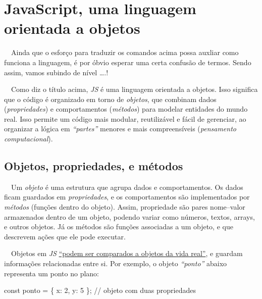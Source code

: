 \documentclass[
  portuguese,
  letterpaper,
  DIV=11,
  numbers=noendperiod]{scrreprt}
\newenvironment{Shaded}{\begin{snugshade}}{\end{snugshade}}
\newcommand{\DecValTok}[1]{\textcolor[rgb]{0.68,0.00,0.00}{#1}}
\newcommand{\ErrorTok}[1]{\textcolor[rgb]{0.68,0.00,0.00}{#1}}
\newcommand{\NormalTok}[1]{\textcolor[rgb]{0.00,0.23,0.31}{#1}}
\newcommand{\OtherTok}[1]{\textcolor[rgb]{0.00,0.23,0.31}{#1}}
\newcommand{\SpecialCharTok}[1]{\textcolor[rgb]{0.37,0.37,0.37}{#1}}
\begin{document}
\section{JavaScript, uma linguagem orientada a
objetos}\label{javascript-uma-linguagem-orientada-a-objetos}

~~Ainda que o esforço para traduzir os comandos acima possa auxliar como
funciona a linguagem, é por óbvio esperar uma certa confusão de termos.
Sendo assim, vamos subindo de nível \ldots.!

~~Como diz o título acima, \emph{JS} é uma linguagem orientada a
objetos. Isso significa que o código é organizado em torno de
\emph{objetos}, que combinam dados (\emph{propriedades}) e
comportamentos (\emph{métodos}) para modelar entidades do mundo real.
Isso permite um código mais modular, reutilizável e fácil de gerenciar,
ao organizar a lógica em \emph{``partes''} menores e mais compreensíveis
(\emph{pensamento computacional}).

\subsection{Objetos, propriedades, e
métodos}\label{objetos-propriedades-e-muxe9todos}

~~Um \emph{objeto} é uma estrutura que agrupa dados e comportamentos. Os
dados ficam guardados em \emph{propriedades}, e os comportamentos são
implementados por \emph{métodos} (funções dentro do objeto). Assim,
propriedade são pares nome--valor armazenados dentro de um objeto,
podendo variar como números, textos, arrays, e outros objetos. Já os
métodos são funções associadas a um objeto, e que descrevem ações que
ele pode executar.

~~Objetos em \emph{JS}
\href{https://developer.mozilla.org/pt-BR/docs/Web/JavaScript/Guide/Working_with_objects}{``podem
ser comparados a objetos da vida real''}, e guardam informações
relacionadas entre si. Por exemplo, o objeto \emph{``ponto''} abaixo
representa um ponto no plano:

\begin{Shaded}
\begin{Highlighting}[]
\NormalTok{const ponto }\OtherTok{=}\NormalTok{ \{ x}\SpecialCharTok{:} \DecValTok{2}\NormalTok{, y}\SpecialCharTok{:} \DecValTok{5}\NormalTok{ \};  }\SpecialCharTok{/}\ErrorTok{/}\NormalTok{ objeto com duas propriedades}
\end{Highlighting}
\end{Shaded}
\end{document}
